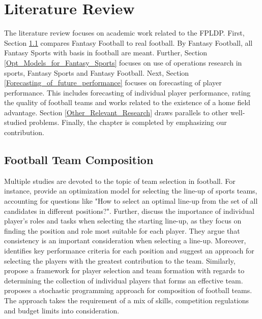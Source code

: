 
\chapter{Literature Review}

The literature review focuses on academic work related to the FPLDP. First, Section \ref{Literature_fantasy_real} compares Fantasy Football to real football. By Fantasy Football, all Fantasy Sports with basis in football are meant. Further, Section \ref{Opt_Models_for_Fantasy_Sports} focuses on use of operations research in sports, Fantasy Sports and Fantasy Football. Next, Section \ref{Forecasting_of_future_performance} focuses on forecasting of player performance. This includes forecasting of individual player performance, rating the quality of football teams and works related to the existence of a home field advantage. Section \ref{Other_Relevant_Research} draws parallels to other well-studied problems. Finally, the chapter is completed by emphasizing our contribution.

\section{Football Team Composition} \label{Literature_fantasy_real}

Multiple studies are devoted to the topic of team selection in football. For instance, \cite{Boon} provide an optimization model for selecting the line-up of sports teams, accounting for questions like "How to select an optimal line-up from the set of all candidates in different positions?". Further, \cite{Trninic} discuss the importance of individual player's roles and tasks when selecting the starting line-up, as they focus on finding the position and role most suitable for each player. They argue that consistency is an important consideration when selecting a line-up. Moreover, \cite{Ozceylan} identifies key performance criteria for each position and suggest an approach for selecting the players with the greatest contribution to the team. Similarly, \cite{Tavana} propose a framework for player selection and team formation with regards to determining the collection of individual players that forms an effective team. \cite{Pantuso} proposes a stochastic programming approach for composition of football teams. The approach takes the requirement of a mix of skills, competition regulations and budget limits into consideration. 


